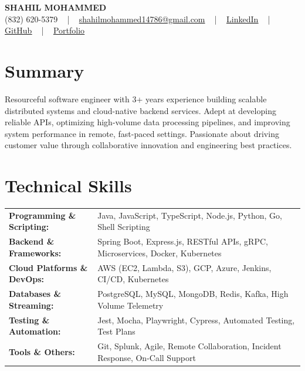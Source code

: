 \documentclass[letterpaper,11pt]{article}
\begin{document}
\begin{center}
    {\fontsize{14pt}{12pt}\selectfont \textbf{\MakeUppercase{Shahil Mohammed}}}\\ \vspace{2pt}
    \fontsize{10pt}{12pt}\selectfont (832) 620-5379 ~ | ~ \href{mailto:shahilmohammed14786@gmail.com}{shahilmohammed14786@gmail.com} ~ | ~  
    \href{https://www.linkedin.com/in/shahil-mohammed-9652931a1/}{\color{blue}\underline{LinkedIn}}  ~ | ~ 
    \href{https://github.com/freakbeast14}{\color{blue}\underline{GitHub}} ~ | ~ 
    \href{https://shahil-mohammed.netlify.app/}{\color{blue}\underline{Portfolio}}
    \vspace{-8pt}
\end{center}

\section{Summary}
\fontsize{9pt}{10pt}\selectfont
Resourceful software engineer with 3+ years experience building scalable distributed systems and cloud-native backend services. Adept at developing reliable APIs, optimizing high-volume data processing pipelines, and improving system performance in remote, fast-paced settings. Passionate about driving customer value through collaborative innovation and engineering best practices.
 \vspace{-5pt}
 
\section{Technical Skills}
        \vspace{-14pt}
        \begin{table}[h]
            \fontsize{9pt}{10pt}\selectfont
            \begin{tabular}{p{0.3\linewidth} p{0.7\linewidth}}
                \textbf{Programming \& Scripting:} & Java, JavaScript, TypeScript, Node.js, Python, Go, Shell Scripting \\
                \textbf{Backend \& Frameworks:} & Spring Boot, Express.js, RESTful APIs, gRPC, Microservices, Docker, Kubernetes \\
                \textbf{Cloud Platforms \& DevOps:} & AWS (EC2, Lambda, S3), GCP, Azure, Jenkins, CI/CD, Kubernetes \\
                \textbf{Databases \& Streaming:} & PostgreSQL, MySQL, MongoDB, Redis, Kafka, High Volume Telemetry \\
                \textbf{Testing \& Automation:} & Jest, Mocha, Playwright, Cypress, Automated Testing, Test Plans \\
                \textbf{Tools \& Others:} & Git, Splunk, Agile, Remote Collaboration, Incident Response, On-Call Support \\
            \end{tabular}
        \end{table}
 \vspace{-15pt}
 
\end{document}
